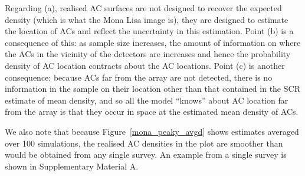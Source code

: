 \documentclass[useAMS,usenatbib,referee]{biom}
\begin{document}
Regarding (a), realised AC surfaces are not designed to recover the expected density (which is what the Mona Lisa image is), they are designed to estimate the location of ACs and reflect the uncertainty in this estimation. Point (b) is a consequence of this: as sample size increases, the amount of information on where the ACs in the vicinity of the detectors are increases and hence the probability density of AC location contracts about the AC locations. Point (c) is another consequence: because ACs far from the array are not detected, there is no information in the sample on their location other than that contained in the SCR estimate of mean density, and so all the model ``knows'' about AC location far from the array is that they occur in space at the estimated mean density of ACs. 

We also note that because Figure~\ref{mona_peaky_avgd} shows estimates averaged over 100 simulations, the realised AC densities in the plot are smoother than would be obtained from any single survey. An example from a single survey is shown in Supplementary Material A.


\end{document}
